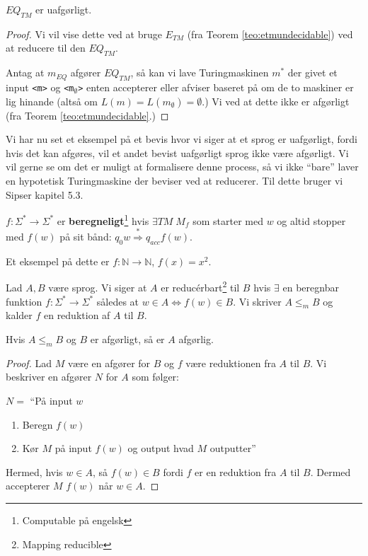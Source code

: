 \begin{theorem}
	$EQ_{TM}$ er uafgørligt.
\end{theorem}

\begin{proof}
	Vi vil vise dette ved at bruge $E_{TM}$ (fra Teorem \ref{teo:etmundecidable}) ved at reducere til den $EQ_{TM}$.

	Antag at $m_{EQ}$ afgører $EQ_{TM}$, så kan vi lave Turingmaskinen $m^{*}$ der givet et input \texttt{<m>} og \texttt{<m$_{\emptyset}$>} enten accepterer eller afviser baseret på om de to maskiner er lig hinande (altså om $L(m) = L(m_{\emptyset}) = \emptyset$.) Vi ved at dette ikke er afgørligt (fra Teorem \ref{teo:etmundecidable}.)
\end{proof}

Vi har nu set et eksempel på et bevis hvor vi siger at et sprog er uafgørligt, fordi hvis det kan afgøres, vil et andet bevist uafgørligt sprog ikke være afgørligt. Vi vil gerne se om det er muligt at formalisere denne process, så vi ikke ``bare'' laver en hypotetisk Turingmaskine der beviser ved at reducerer. Til dette bruger vi Sipser kapitel 5.3.
\begin{definition}
	$f : \Sigma^{*} \rightarrow \Sigma^{*}$ er \textbf{beregneligt}\footnote{Computable på engelsk} hvis $\exists TM \;M_{f}$ som starter med $w$ og altid stopper med $f(w)$ på sit bånd: $q_{0}w \stackrel{*}{\Rightarrow} q_{acc}f(w)$.
\end{definition}

Et eksempel på dette er $f : \mathbb{N} \rightarrow \mathbb{N}$, $f(x) = x^{2}$.

\begin{definition}
	Lad $A, B$ være sprog. Vi siger at $A$ er reducérbart\footnote{Mapping reducible} til $B$ hvis $\exists$ en beregnbar funktion $f : \Sigma^{*} \rightarrow \Sigma^{*}$ således at $w \in A \iff f(w) \in B$. Vi skriver $A \le _{m}B$ og kalder $f$ en reduktion af $A$ til $B$.
\end{definition}

\begin{theorem}
	Hvis $A \leq _{m}B$ og $B$ er afgørligt, så er $A$ afgørlig.
\end{theorem}

\begin{proof}
	Lad $M$ være en afgører for $B$ og $f$ være reduktionen fra $A$ til $B$. Vi beskriver en afgører $N$ for $A$ som følger:

	$N = $ ``På input $w$
	\begin{enumerate}
		\item Beregn $f(w)$
		\item Kør $M$ på input $f(w)$ og output hvad $M$ outputter''
	\end{enumerate}

	Hermed, hvis $w \in A$, så $f(w) \in B$ fordi $f$ er en reduktion fra $A$ til $B$. Dermed accepterer $M$ $f(w)$ når $w \in A$.
\end{proof}

